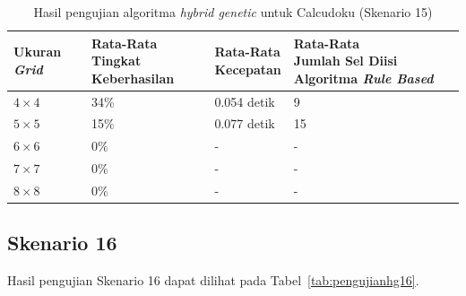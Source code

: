 \begin{table}
\centering
\captionsetup{justification=centering}
\caption[Hasil pengujian algoritma \textit{hybrid genetic} untuk Calcudoku (Skenario 15)]{Hasil pengujian algoritma \textit{hybrid genetic} untuk Calcudoku (Skenario 15)}
\begin{tabular}{| l | l | l | l |}
\hline
Ukuran \textit{Grid} & \makecell[l]{Rata-Rata \\ Tingkat Keberhasilan} & \makecell[l]{Rata-Rata \\ Kecepatan} & \makecell[l]{Rata-Rata \\ Jumlah Sel Diisi Algoritma \textit{Rule Based}} \\
\hline \hline
\begin{math}4 \times 4\end{math} & 34\% & 0.054 detik & 9 \\
\hline
\begin{math}5 \times 5\end{math} & 15\% & 0.077 detik & 15 \\
\hline
\begin{math}6 \times 6\end{math} & 0\% & - & - \\
\hline
\begin{math}7 \times 7\end{math} & 0\% & - & - \\
\hline
\begin{math}8 \times 8\end{math} & 0\% & - & - \\
\hline
\end{tabular}
\label{tab:pengujianhg15}
\end{table}

\subsection{Skenario 16}
\label{sec:skenario16}

Hasil pengujian Skenario 16 dapat dilihat pada Tabel~\ref{tab:pengujianhg16}.

